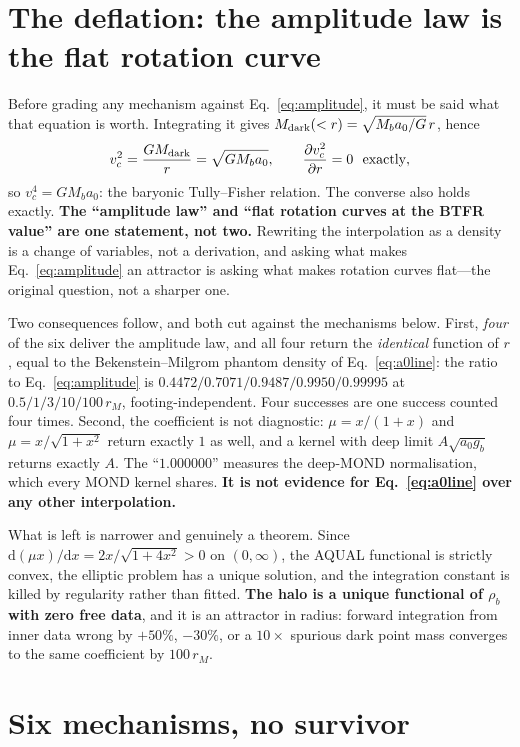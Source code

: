 \documentclass[aps,prd,twocolumn,superscriptaddress,nofootinbib,floatfix]{revtex4-2}
\begin{document}
\section{The deflation: the amplitude law is the flat rotation curve}

Before grading any mechanism against Eq.~\eqref{eq:amplitude}, it must be said what that
equation is worth. Integrating it gives $M_{\rm dark}(<r) = \sqrt{M_ba_0/G}\,r$, hence
\begin{equation}
v_c^2 = \frac{GM_{\rm dark}}{r} = \sqrt{GM_ba_0},
\qquad \frac{\partial v_c^2}{\partial r} = 0 \ \ \text{exactly},
\end{equation}
so $v_c^4 = GM_ba_0$: the baryonic Tully--Fisher relation. The converse also holds
exactly. \textbf{The ``amplitude law'' and ``flat rotation curves at the BTFR value'' are
one statement, not two.} Rewriting the interpolation as a density is a change of variables,
not a derivation, and asking what makes Eq.~\eqref{eq:amplitude} an attractor is asking
what makes rotation curves flat---the original question, not a sharper one.

Two consequences follow, and both cut against the mechanisms below. First, \emph{four}
of the six deliver the amplitude law, and all four return the \emph{identical} function of
$r$, equal to the Bekenstein--Milgrom phantom density of Eq.~\eqref{eq:a0line}: the ratio
to Eq.~\eqref{eq:amplitude} is $0.4472/0.7071/0.9487/0.9950/0.99995$ at
$0.5/1/3/10/100\,r_M$, footing-independent. Four successes are one success counted four
times. Second, the coefficient is not diagnostic: $\mu = x/(1+x)$ and
$\mu = x/\sqrt{1+x^2}$ return exactly $1$ as well, and a kernel with deep limit
$A\sqrt{a_0g_b}$ returns exactly $A$. The ``$1.000000$'' measures the deep-MOND
normalisation, which every MOND kernel shares. \textbf{It is not evidence for
Eq.~\eqref{eq:a0line} over any other interpolation.}

What is left is narrower and genuinely a theorem. Since
$\mathrm{d}(\mu x)/\mathrm{d}x = 2x/\sqrt{1+4x^2} > 0$ on $(0,\infty)$, the AQUAL
functional is strictly convex, the elliptic problem has a unique solution, and the
integration constant is killed by regularity rather than fitted. \textbf{The halo is a
unique functional of $\rho_b$ with zero free data}, and it is an attractor in radius:
forward integration from inner data wrong by $+50\%$, $-30\%$, or a $10\times$ spurious
dark point mass converges to the same coefficient by $100\,r_M$.

\section{Six mechanisms, no survivor}
\end{document}
